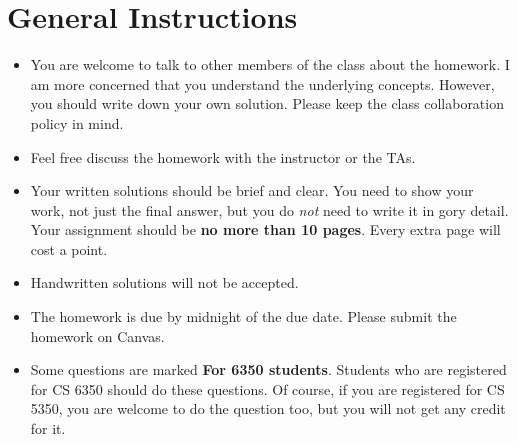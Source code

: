 \section*{General Instructions}

{\footnotesize
  \begin{itemize}
  \item You are welcome to talk to other members of the class about
    the homework. I am more concerned that you understand the
    underlying concepts. However, you should write down your own
    solution. Please keep the class collaboration policy in mind.

  \item Feel free discuss the homework with the instructor or the TAs.

  \item Your written solutions should be brief and clear. You need to
    show your work, not just the final answer, but you do \emph{not}
    need to write it in gory detail. Your assignment should be {\bf no
      more than 10 pages}. Every extra page will cost a point.

  \item Handwritten solutions will not be accepted.

  \item The homework is due by midnight of the due date. Please submit
    the homework on Canvas.

  \item Some questions are marked {\bf For 6350 students}. Students
    who are registered for CS 6350 should do these questions. Of
    course, if you are registered for CS 5350, you are welcome to do
    the question too, but you will not get any credit for it.

  \end{itemize}
}

